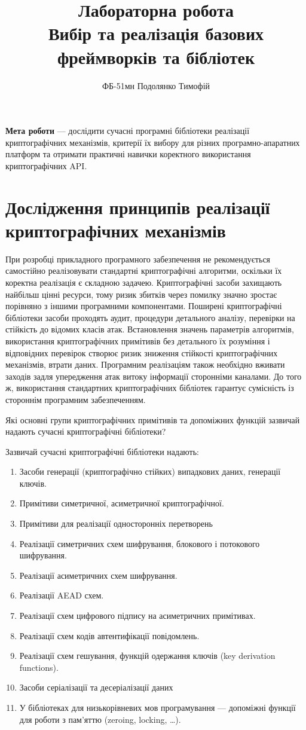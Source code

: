 \documentclass{kpi-lab}
\title{Лабораторна робота \textnumero 1\\
  Вибір та реалізація базових фреймворків та бібліотек
}
\author{ФБ-51мн Подолянко Тимофій}
\date{}
\begin{document}
\maketitle
\tableofcontents
\bigskip

\textbf{Мета роботи} ---
дослідити сучасні програмні бібліотеки реалізації
криптографічних механізмів,
критерії їх вибору для різних програмно-апаратних платформ
та отримати практичні навички коректного використання
криптографічних API.

\chapter{Дослідження принципів реалізації криптографічних механізмів}

При розробці прикладного програмного забезпечення не
рекомендується самостійно реалізовувати стандартні
криптографічні алгоритми, оскільки їх коректна реалізація
є складною задачею.
Криптографічні засоби захищають найбільш цінні ресурси,
тому ризик збитків через помилку значно зростає
порівняно з іншими програмними компонентами.
Поширені криптографічні бібліотеки засоби проходять аудит, процедури
детального аналізу, перевірки на стійкість до відомих класів атак.
Встановлення значень параметрів алгоритмів,
використання криптографічних примітивів
без детального їх розуміння і відповідних перевірок
створює ризик
зниження стійкості криптографічних механізмів, втрати даних.
Програмним реалізаціям також необхідно вживати заходів
задля упередження атак витоку інформації сторонніми каналами.
До того ж, використання стандартних криптографічних
бібліотек гарантує сумісність із стороннім програмним забезпеченням.

Які основні групи криптографічних примітивів та допоміжних
функцій зазвичай надають сучасні криптографічні бібліотеки?

Зазвичай сучасні криптографічні бібліотеки надають:
\begin{enumerate}
  \item Засоби генерації (криптографічно стійких)
    випадкових даних, генерації ключів.
  \item Примітиви симетричної, асиметричної криптографічної.
  \item Примітиви для реалізації односторонніх перетворень
  \item Реалізації симетричних схем шифрування, блокового і
    потокового шифрування.
  \item Реалізації асиметричних схем шифрування.
  \item Реалізації AEAD схем.
  \item Реалізації схем цифрового підпису на асиметричних примітивах.
  \item Реалізації схем кодів автентифікації повідомлень.
  \item Реалізації схем гешування, функцій одержання ключів
    (key derivation functions).
  \item Засоби серіалізації та десеріалізації даних
  \item У бібліотеках для низькорівневих мов програмування
    --- допоміжні функції для роботи з пам'яттю (zeroing,
    locking, \dots).
\end{enumerate}
\end{document}
